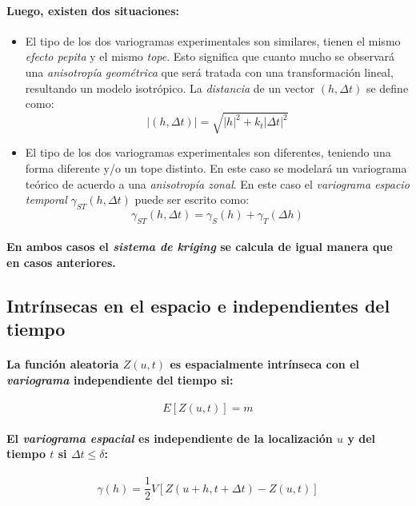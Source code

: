 \paragraph{
Luego, existen dos situaciones:
}
\begin{itemize}
\item El tipo de los dos variogramas experimentales son similares, tienen el mismo \emph{efecto pepita} y el mismo \emph{tope}. Esto significa que cuanto mucho se observará una \emph{anisotropía geométrica} que será tratada con una transformación lineal, resultando un modelo isotrópico. La \emph{distancia} de un vector $(h,\Delta t)$ se define como:
\begin{equation}
|(h,\Delta t)| = \sqrt{ | h | ^2 + k_t | \Delta t | ^2}
\end{equation}
\item El tipo de los dos variogramas experimentales son diferentes, teniendo una forma diferente y/o un tope distinto. En este caso se modelará un variograma teórico de acuerdo a una \emph{anisotropía zonal}. En este caso el \emph{variograma espacio temporal} $\gamma_{ST}(h,\Delta t)$ puede ser escrito como:
\begin{equation}
\gamma_{ST}(h,\Delta t) = \gamma_S(h) + \gamma_T(\Delta h)
\end{equation}
\end{itemize}
\paragraph{
En ambos casos el \emph{sistema de kriging} se calcula de igual manera que en casos anteriores.
}


\subsection{Intrínsecas en el espacio e independientes del tiempo}
\paragraph{
La función aleatoria $Z(u,t)$ es espacialmente intrínseca con el \emph{variograma} independiente del tiempo si:
}
\begin{equation}
E[Z(u,t)] = m
\end{equation}
\paragraph{
El \emph{variograma espacial} es independiente de la localización $u$ y del tiempo $t$ si $\Delta t \leq \delta$:
}
\begin{equation}
\gamma(h) = \frac{1}{2} V[Z(u+h,t+\Delta t) - Z(u,t)]
\end{equation}


